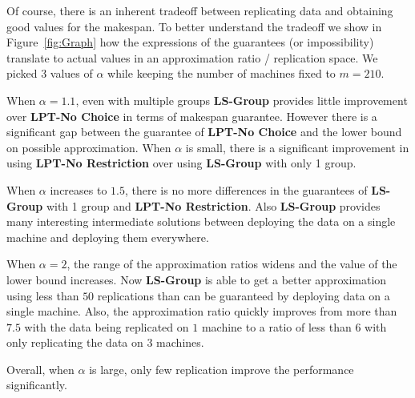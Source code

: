 \documentclass[10pt, conference, compsocconf]{IEEEtran}
\begin{document}
Of course, there is an inherent tradeoff between replicating data and
obtaining good values for the makespan. To better understand the
tradeoff we show in Figure~\ref{fig:Graph} how the expressions of the
guarantees (or impossibility) translate to actual values in an
approximation ratio / replication space.  We picked 3 values of
$\alpha$ while keeping the number of machines fixed to $m=210$. 

When $\alpha=1.1$, even with multiple groups {\bf LS-Group} provides little
improvement over {\bf LPT-No Choice} in terms of makespan guarantee. However there is a significant
gap between the guarantee of {\bf LPT-No Choice} and the lower bound
on possible approximation. When $\alpha$ is small, there is a
significant improvement in using {\bf LPT-No Restriction} over using
 {\bf LS-Group} with only 1 group.

When $\alpha$ increases to $1.5$, there is no more differences in the
guarantees of {\bf LS-Group} with 1 group and {\bf LPT-No
  Restriction}. Also {\bf LS-Group} provides many interesting intermediate
solutions between deploying the data on a single machine and deploying
them everywhere.

When $\alpha=2$, the range of the approximation ratios widens and
the value of the lower bound increases. Now {\bf LS-Group} is able to
get a better approximation using less than $50$ replications than 
can be guaranteed by deploying data on a single machine. Also, the
approximation ratio quickly improves from more than $7.5$ with the
data being replicated on $1$ machine to a ratio of less than $6$ with
only replicating the data on $3$ machines.

Overall, when $\alpha$ is large, only few replication improve the
performance significantly.
\end{document}
